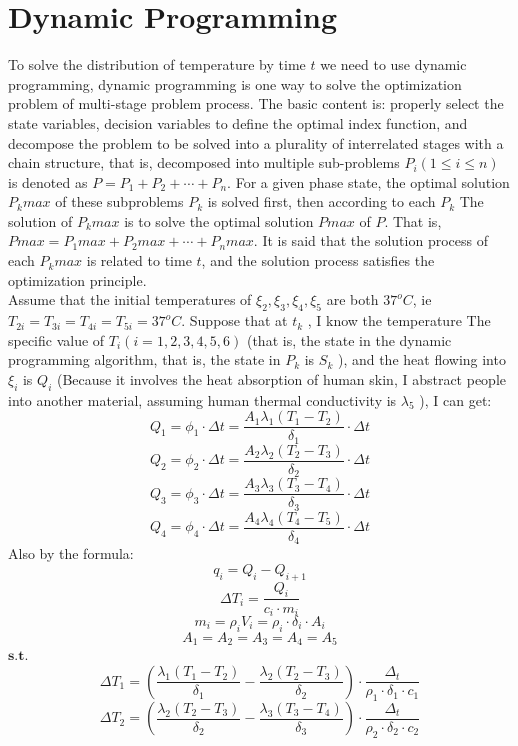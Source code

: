 \documentclass[12pt]{ctexart}
\begin{document}
\section{Dynamic Programming}
\indent To solve the distribution of temperature by time $t$ we need to use dynamic programming, dynamic programming is one way to solve the optimization problem of multi-stage problem process. The basic content is: properly select the state variables, decision variables to define the optimal index function, and decompose the problem to be solved into a plurality of interrelated stages with a chain structure, that is, decomposed into multiple sub-problems $P_i (1 \leq i \leq n)$ is denoted as $P = P_1 + P_2 + \cdots + P_n$. For a given phase state, the optimal solution $P_k max$ of these subproblems $P_k$ is solved first, then according to each $P_{k}$ The solution of $P_{k}max$ is to solve the optimal solution $Pmax$ of $P$. That is, $Pmax = P_1 max + P_2 max + \cdots + P_n max$\cite{sakoe1978dynamic}.
It is said that the solution process of each $P_k max$ is related to time $t$, and the solution process satisfies the optimization principle\cite{bertsekas2005dynamic}.\\
\indent Assume that the initial temperatures of $\xi_2 , \xi_3 , \xi_4 , \xi_5$ are both $37^{o}C$, ie $T_{2i} = T_{3i} = T_{4i} = T_{5i} = 37^{o}C$. Suppose that at $t_k$ , I know the temperature
The specific value of $T_i (i = 1, 2, 3, 4, 5, 6)$ (that is, the state in the dynamic programming algorithm, that is, the state in $P_k$ is $S_k$ ), and the heat flowing into $\xi_i$ is $Q_i$ (Because it involves the heat absorption of human skin, I abstract people into another material, assuming human thermal conductivity is $\lambda_5$ ), I can get:
\[Q_{1} = \phi_{1}\cdot \Delta t = \frac{A_{1}\lambda_{1}(T_1-T_2)}{\delta_{1}}\cdot \Delta t\]
\[Q_{2} = \phi_{2}\cdot \Delta t = \frac{A_{2}\lambda_{2}(T_2-T_3)}{\delta_{2}}\cdot \Delta t\]
\[Q_{3} = \phi_{3}\cdot \Delta t = \frac{A_{3}\lambda_{3}(T_3-T_4)}{\delta_{3}}\cdot \Delta t\]
\[Q_{4} = \phi_{4}\cdot \Delta t = \frac{A_{4}\lambda_{4}(T_4-T_5)}{\delta_{4}}\cdot \Delta t\]
\indent Also by the formula\cite{callen1998thermodynamics}:
\[q_{i} = Q_{i} - Q_{i+1}\]
\[\Delta T_{i} = \frac{Q_{i}}{c_{i}\cdot m_{i}}\]
\[m_{i} = \rho_{i}V_{i} = \rho_{i}\cdot \delta_{i}\cdot A_{i}\]
\[A_{1} = A_{2} = A_{3} = A_{4} = A_{5}\]
\indent$\textbf{s.t.}$
\[\Delta T_{1} = (\frac{\lambda_{1}(T_{1}-T_{2})}{\delta_{1}} - \frac{\lambda_{2}(T_{2}-T_{3})}{\delta_{2}})\cdot\frac{\Delta_{t}}{\rho_{1}\cdot\delta_{1}\cdot c_{1}}\]
\[\Delta T_{2} = (\frac{\lambda_{2}(T_{2}-T_{3})}{\delta_{2}} - \frac{\lambda_{3}(T_{3}-T_{4})}{\delta_{3}})\cdot\frac{\Delta_{t}}{\rho_{2}\cdot\delta_{2}\cdot c_{2}}\]
\end{document}
